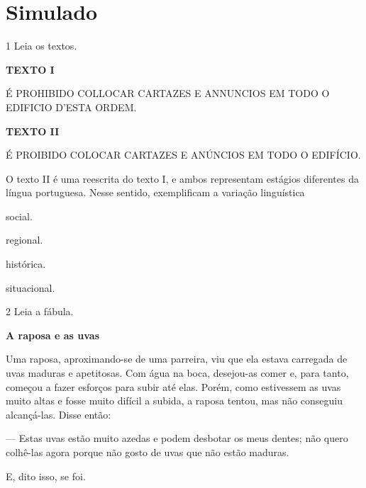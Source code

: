 
\chapter[Simulado 3]{Simulado}

\num{1} Leia os textos.

\begin{myquote}
\textbf{TEXTO I}

É PROHIBIDO COLLOCAR CARTAZES E ANNUNCIOS EM TODO O EDIFICIO D'ESTA ORDEM.
\end{myquote}

\begin{myquote}
\textbf{TEXTO II}

É PROIBIDO COLOCAR CARTAZES E ANÚNCIOS EM TODO O EDIFÍCIO.
\end{myquote}

O texto II é uma reescrita do texto I, e ambos representam estágios
diferentes da língua portuguesa. Nesse sentido, exemplificam a variação
linguística

\begin{multicols}{2}
\begin{escolha}
\item
  social.
\item
  regional.
\item
  histórica.
\item
  situacional.
\end{escolha}
\end{multicols}

\num{2} Leia a fábula.

\begin{myquote}
\textbf{A raposa e as uvas}

Uma raposa, aproximando-se de uma parreira, viu que ela estava carregada
de uvas maduras e apetitosas. Com água na boca, desejou-as comer e, para
tanto, começou a fazer esforços para subir até elas. Porém, como
estivessem as uvas muito altas e fosse muito difícil a subida, a raposa
tentou, mas não conseguiu alcançá-las. Disse então:

--- Estas uvas estão muito azedas e podem desbotar os meus dentes; não
quero colhê-las agora porque não gosto de uvas que não estão maduras.

E, dito isso, se foi.

\end{myquote}

